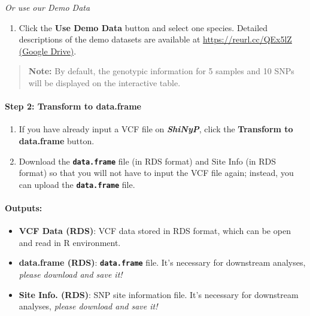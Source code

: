 \documentclass[
]{book}
\providecommand{\tightlist}{%
  \setlength{\itemsep}{0pt}\setlength{\parskip}{0pt}}
\begin{document}
\emph{Or use our Demo Data}

\begin{enumerate}
\def\labelenumi{\arabic{enumi}.}
\tightlist
\item
  Click the {\textbf{Use Demo Data}} button and select one species. Detailed descriptions of the demo datasets are available at \href{https://reurl.cc/QEx5lZ}{https://reurl.cc/QEx5lZ (Google Drive)}.
\end{enumerate}

\begin{quote}
\textbf{Note:} By default, the genotypic information for 5 samples and 10 SNPs will be displayed on the interactive table.
\end{quote}

\paragraph*{Step 2: Transform to data.frame}\label{step-2-transform-to-data.frame}

\begin{enumerate}
\def\labelenumi{\arabic{enumi}.}
\item
  If you have already input a VCF file on {\textbf{\emph{ShiNyP}}}, click the {\textbf{Transform to data.frame}} button.
\item
  Download the {\textbf{\texttt{data.frame}}} file (in RDS format) and Site Info (in RDS format) so that you will not have to input the VCF file again; instead, you can upload the {\textbf{\texttt{data.frame}}} file.
\end{enumerate}

\paragraph*{Outputs:}\label{outputs}

\begin{itemize}
\item
  \textbf{VCF Data (RDS)}: VCF data stored in RDS format, which can be open and read in R environment.
\item
  \textbf{data.frame (RDS)}: {\textbf{\texttt{data.frame}}} file. It's necessary for downstream analyses, \emph{please download and save it!}
\item
  \textbf{Site Info. (RDS)}: SNP site information file. It's necessary for downstream analyses, \emph{please download and save it!}
\end{itemize}
\end{document}
